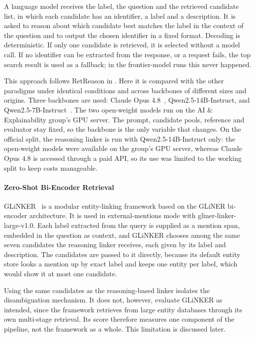 A language model receives the label, the question and the retrieved candidate list, in which each candidate has an identifier, a label and a description.
It is asked to reason about which candidate best matches the label in the context of the question and to output the chosen identifier in a fixed format.
Decoding is deterministic.
If only one candidate is retrieved, it is selected without a model call.
If no identifier can be extracted from the response, or a request fails, the top search result is used as a fallback; in the frontier-model runs this never happened.

This approach follows RetReason in \textcite{alekseev2025querybased}.
Here it is compared with the other paradigms under identical conditions and across backbones of different sizes and origins.
Three backbones are used: Claude Opus 4.8~\citep{anthropic2026opus48}, Qwen2.5-14B-Instruct, and Qwen2.5-7B-Instruct~\citep{qwen2024qwen25}.
The two open-weight models run on the AI \& Explainability group's GPU server.
The prompt, candidate pools, reference and evaluator stay fixed, so the backbone is the only variable that changes.
On the official split, the reasoning linker is run with Qwen2.5-14B-Instruct only: the open-weight models were available on the group's GPU server, whereas Claude Opus 4.8 is accessed through a paid API, so its use was limited to the working split to keep costs manageable.

\paragraph{Zero-Shot Bi-Encoder
Retrieval}

GLiNKER~\parencite{stepanov2026glinker} is a modular entity-linking framework based on the GLiNER bi-encoder architecture.
It is used in external-mentions mode with gliner-linker-large-v1.0.
Each label extracted from the query is supplied as a mention span, embedded in the question as context, and GLiNKER chooses among the same seven candidates the reasoning linker receives, each given by its label and description.
The candidates are passed to it directly, because its default entity store looks a mention up by exact label and keeps one entity per label, which would show it at most one candidate.

Using the same candidates as the reasoning-based linker isolates the disambiguation mechanism. It does not, however, evaluate GLiNKER as intended, since the framework retrieves from large entity databases through its own multi-stage retrieval. Its score therefore measures one component of the pipeline, not the framework as a whole. This limitation is discussed later.

